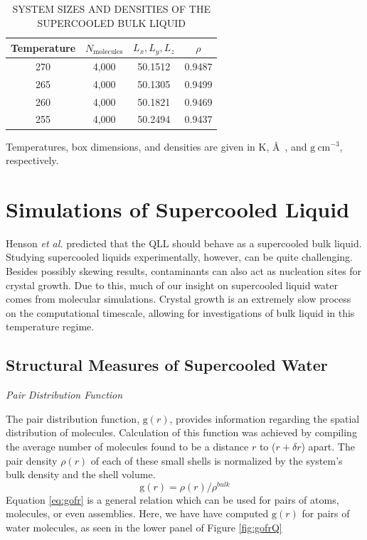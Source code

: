 \begin{table}[h] \centering \caption{SYSTEM SIZES AND DENSITIES OF THE SUPERCOOLED BULK LIQUID\label{tab:qll-liquid}}
\begin{tabular}{cccc}
\hline
\hline
 Temperature & $N_\mathrm{molecules}$ & $L_x, L_y, L_z$ & $\rho$\\
\hline
270 & 4,000 & 50.1512 & 0.9487 \\
265 & 4,000 & 50.1305 & 0.9499 \\
260 & 4,000 & 50.1821 & 0.9469 \\
255 & 4,000 & 50.2494 & 0.9437 \\
\hline
\hline
\end{tabular}
\begin{flushleft}
Temperatures, box dimensions, and densities are given in K, \AA~, and
$\mathrm{g}~\mathrm{cm}^{-3}$, respectively.
\end{flushleft}
\end{table}



\section{Simulations of Supercooled Liquid}
Henson \textit{et al.} predicted that the QLL should behave as a
supercooled bulk liquid.\cite{Henson2005} Studying supercooled liquids
experimentally, however, can be quite challenging. Besides possibly
skewing results, contaminants can also act as nucleation sites for
crystal growth. Due to this, much of our insight on supercooled liquid
water comes from molecular simulations. Crystal growth is an extremely
slow process on the computational timescale, allowing for
investigations of bulk liquid in this temperature regime. 

\subsection{Structural Measures of Supercooled Water}

\begin{flushleft}
\textit{Pair Distribution Function}
\end{flushleft}

The pair distribution function, $\mathrm{g}(r)$, provides information
regarding the spatial distribution of molecules. Calculation of this
function was achieved by compiling the average number of molecules
found to be a distance $r$ to ($r + \delta r$) apart. The
pair density $\rho (r)$ of each of these small shells is normalized by
the system's bulk density and the shell volume.
\begin{equation}\label{eq:gofr}
\mathrm{g}(r) = \rho(r) / \rho^{bulk}
\end{equation}
Equation \eqref{eq:gofr} is a general relation which can be used for
pairs of atoms, molecules, or even assemblies. Here, we have have
computed $\mathrm{g}(r)$ for pairs of water molecules, as
seen in the lower panel of Figure \ref{fig:gofrQ}

